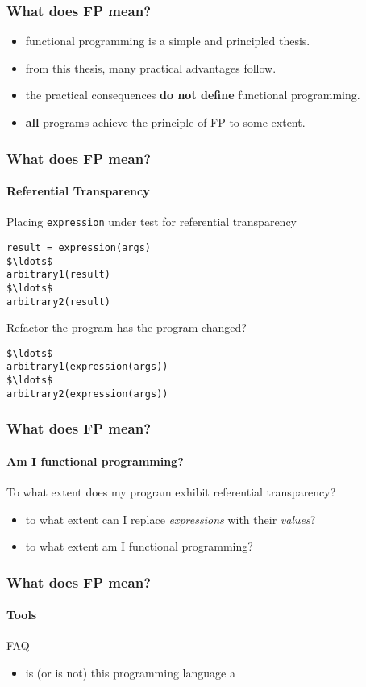 \begin{frame}
\frametitle{What does FP mean?}
\begin{itemize}
  \item<1-> functional programming is a simple and principled thesis.
  \item<1-> from this thesis, many practical advantages follow.
  \item<2-> the practical consequences \textbf{do not define} functional programming.
  \item<3-> \textbf{all} programs achieve the principle of FP to some extent.
\end{itemize}
\end{frame}

\begin{frame}[fragile]
\frametitle{What does FP mean?}
\framesubtitle{Referential Transparency}
\begin{block}{Placing \lstinline{expression} under test for referential transparency}
\scriptsize
\begin{lstlisting}[mathescape]
result = expression(args)
$\ldots$
arbitrary1(result)
$\ldots$
arbitrary2(result)
\end{lstlisting}
\end{block}
\begin{block}{Refactor the program \textemdash has the program changed?}
\scriptsize
\begin{lstlisting}[mathescape]
$\ldots$
arbitrary1(expression(args))
$\ldots$
arbitrary2(expression(args))
\end{lstlisting}
\end{block}
\end{frame}

\begin{frame}[fragile]
\frametitle{What does FP mean?}
\framesubtitle{Am I functional programming?}
\begin{block}{To what extent does my program exhibit referential transparency?}
\begin{itemize}
  \item<1-> to what extent can I replace \emph{expressions} with their \emph{values}?
  \item<2-> to what extent am I functional programming?
\end{itemize}
\end{block}
\end{frame}

\begin{frame}[fragile]
\frametitle{What does FP mean?}
\framesubtitle{Tools}
\begin{block}{FAQ}
\begin{itemize}
  \item<1-> is (or is not) this programming language a 
\end{itemize}
\end{block}
\end{frame}
